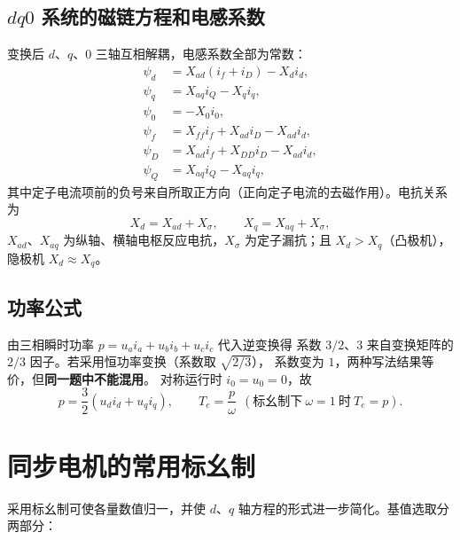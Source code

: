 \subsection{$dq0$ 系统的磁链方程和电感系数}

变换后 $d$、$q$、$0$ 三轴互相解耦，电感系数全部为常数：
\begin{align}
  \psi_d&=X_{ad}\left(i_f+i_D\right)-X_d i_d,\\
  \psi_q&=X_{aq}i_Q-X_q i_q,\\
  \psi_0&=-X_0 i_0,\\
  \psi_f&=X_{ff}i_f+X_{ad}i_D-X_{ad}i_d,\\
  \psi_D&=X_{ad}i_f+X_{DD}i_D-X_{ad}i_d,\\
  \psi_Q&=X_{aq}i_Q-X_{aq}i_q,
\end{align}
其中定子电流项前的负号来自所取正方向（正向定子电流的去磁作用）。电抗关系为
\begin{equation}
  X_d=X_{ad}+X_\sigma,\qquad X_q=X_{aq}+X_\sigma,
\end{equation}
$X_{ad}$、$X_{aq}$ 为纵轴、横轴电枢反应电抗，$X_\sigma$ 为定子漏抗；且
$X_d>X_q$（凸极机），隐极机 $X_d\approx X_q$。

\subsection{功率公式}

由三相瞬时功率 $p=u_ai_a+u_bi_b+u_ci_c$ 代入逆变换得
系数 $3/2$、$3$ 来自变换矩阵的 $2/3$ 因子。若采用恒功率变换（系数取 $\sqrt{2/3}$），
系数变为 $1$，两种写法结果等价，但\textbf{同一题中不能混用}。
对称运行时 $i_0=u_0=0$，故
\begin{equation}
  p=\frac{3}{2}\left(u_di_d+u_qi_q\right),\qquad
  T_e=\frac{p}{\omega}\ \ (\text{标幺制下}\ \omega=1\ \text{时}\ T_e=p).
\end{equation}


\section{同步电机的常用标幺制}

采用标幺制可使各量数值归一，并使 $d$、$q$ 轴方程的形式进一步简化。基值选取分两部分：

